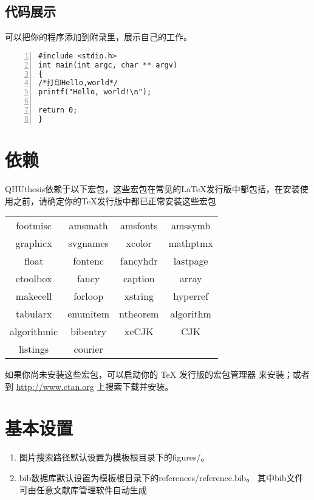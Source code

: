 \subsection{代码展示}
可以把你的程序添加到附录里，展示自己的工作。
\begin{lstlisting}[language={[ANSI]C}, numbers=left]
#include <stdio.h>
int main(int argc, char ** argv)
{
/*打印Hello,world*/
printf("Hello, world!\n");

return 0;
}
\end{lstlisting}
\section{依赖}
QHUthesis依赖于以下宏包，这些宏包在常见的\LaTeX{}发行版中都包括，在安装使用之前，请确定你的\TeX{}发行版中都已正常安装这些宏包
\begin{table}[H]
	\centering
	\begin{tabular}{cccc}
		\hline
		{footmisc} &  {amsmath} &  {amsfonts} &  {amssymb} \\
		
		{graphicx} &  {svgnames} &  {xcolor} &  {mathptmx} \\
		
		{float} &  {fontenc} &  {fancyhdr} &  {lastpage} \\
		
		{etoolbox} &  {fancy} &  {caption} &  {array} \\
		
		{makecell} &  {forloop} &  {xstring} &  {hyperref} \\
		
		{tabularx} &  {enumitem} &  {ntheorem} &  {algorithm}\\
		
		{algorithmic} &  {bibentry} &  {xeCJK} &  {CJK} \\
		{listings} &  {courier} &  {} &  {} \\
		\hline
	\end{tabular}
\end{table}
如果你尚未安装这些宏包，可以启动你的 \TeX{} 发行版的宏包管理器
来安装；或者到 \url{http://www.ctan.org} 上搜索下载并安装。
\section{基本设置}
\begin{enumerate}
	\item 图片搜索路径默认设置为模板根目录下的figures/。
	\item bib数据库默认设置为模板根目录下的references/reference.bib。 其中bib文件可由任意文献库管理软件自动生成
\end{enumerate}

